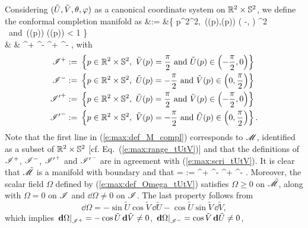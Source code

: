 \ee
Considering $(\tilde{U},\tilde{V},\theta,\varphi)$ as a canonical coordinate system
on $\mathbb{R}^2\times\mathbb{S}^2$, we define the conformal completion manifold as
\bea
    \tilde{\M} &:= &\left\{ p\in \R^2\times\SS^2,\  ((p),(p)) \in \left( -,  \right) ^2 \ \mbox{and}\
       \sinh(\tan {}(p)) \sinh(\tan {}(p)) < 1 \right\}
        \nonumber \\
       & & \cup \scri^+ \cup \scri^- ^+ ^- ,
        \label{e:max:def_M_compl}
\eea
with
\begin{subequations}\label{e:max:def_scri_R2S2}
\begin{align}
   \mathscr{I}^+ := &\ \left\{ p\in \mathbb{R}^2\times\mathbb{S}^2,\  \tilde{V}(p) = \frac{\pi}{2}
        \ \mbox{and}\ \tilde{U}(p) \in \left( -\frac{\pi}{2}, 0 \right) \right\}
            \label{e:max:def_scrip_R2S2} \\
    \mathscr{I}^- := &\ \left\{ p\in \mathbb{R}^2\times\mathbb{S}^2,\  \tilde{U}(p) = -\frac{\pi}{2}
        \ \mbox{and}\ \tilde{V}(p) \in \left( 0, \frac{\pi}{2}\right) \right\} \\
   {\mathscr{I}'}^+ := &\ \left\{ p\in \mathbb{R}^2\times\mathbb{S}^2,\  \tilde{U}(p) = \frac{\pi}{2}
        \ \mbox{and}\ \tilde{V}(p) \in \left( -\frac{\pi}{2}, 0 \right) \right\} \\
   {\mathscr{I}'}^- := &\ \left\{ p\in \mathbb{R}^2\times\mathbb{S}^2,\  \tilde{V}(p) = -\frac{\pi}{2}
        \ \mbox{and}\ \tilde{U}(p) \in \left( 0, \frac{\pi}{2}\right) \right\} .
\end{align}
\end{subequations}
Note that the first line in (\ref{e:max:def_M_compl}) corresponds to $\mathscr{M}$,
identified as a subset of $\mathbb{R}^2\times\mathbb{S}^2$ [cf. Eq.~(\ref{e:max:range_tUtV})]
and that the definitions of $\mathscr{I}^+$, $\mathscr{I}^-$, ${\mathscr{I}'}^+$ and ${\mathscr{I}'}^-$
are in agreement with (\ref{e:max:scri_tUtV}). It is clear that $\tilde{\mathscr{M}}$
is a manifold with boundary and that
\be \label{e:max:scri_tM_4parts}
    \partial\tilde{\M} = \scri := \scri^+ \cup \scri^- ^+
            \cup {\scri'}^- .
\ee
Moreover, the scalar field $\Omega$ defined by (\ref{e:max:def_Omega_tUtV})
satisfies $\Omega \geq 0$ on $\tilde{\mathscr{M}}$, along with
$\Omega = 0$ on $\mathscr{I}$ and $\dd\Omega\not = 0$ on $\mathscr{I}$. The last property
follows from
\[
    \dd\Omega = -\sin\tilde{U} \cos\tilde{V}\, \dd\tilde{U}
            -\cos\tilde{U} \sin\tilde{V}\, \dd\tilde{V} ,
\]
which implies
$\left.\mathbf{d}\Omega\right|_{\mathscr{I}^+} = -\cos\tilde{U}\, \mathbf{d}\tilde{V}\not=0$,
$\left.\mathbf{d}\Omega\right|_{\mathscr{I}^-} = \cos\tilde{V}\, \mathbf{d}\tilde{U}\not=0$,
